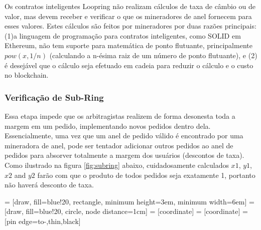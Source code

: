 \documentclass[UTF8,nofonts]{article}
\makeatletter
\newenvironment{figurehere}
 {\def\@captype{figure}}
 {}
\makeatother
\begin{document}
\begin{multicols}{2}
Os contratos inteligentes Loopring não realizam cálculos de taxa de câmbio ou de valor, mas devem receber e verificar o que os mineradores de anel fornecem para esses valores. Estes cálculos são feitos por mineradores por duas razões principais: (1)a linguagem de programação para contratos inteligentes, como SOLID \cite{dannen2017introducing} em Ethereum, não tem suporte para matemática de ponto flutuante, principalmente $pow(x, 1/n)$ (calculando a n-ésima raiz de um número de ponto flutuante), e (2) é desejável que o cálculo seja efetuado em cadeia para reduzir o cálculo e o custo no blockchain.


\subsubsection{Verificação de Sub-Ring\label{sec:sub_ring_check}}
Essa etapa impede que os arbitragistas realizem de forma desonesta toda a margem em um pedido, implementando novos pedidos dentro dela. Essencialmente, uma vez que um anel de pedido válido é encontrado por uma mineradora de anel, pode ser tentador adicionar outros pedidos ao anel de pedidos para absorver totalmente a margem dos usuários (descontos de taxa). Como ilustrado na figura  \ref{fig:subring} abaixo, cuidadosamente calculados $x1$, $y1$, $x2$ and $y2$ farão com que o produto de todos pedidos seja exatamente 1, portanto não haverá desconto de taxa. 

\begin{center}
\begin{figurehere}
\centering
{} = [draw, fill=blue!20, rectangle, 
    minimum height=3em, minimum width=6em]
 = [draw, fill=blue!20, circle, node distance=1cm]
 = [coordinate]
 = [coordinate]
 = [pin edge={to-,thin,black}]

\end{figurehere}
\end{center}
\end{multicols}
\end{document}
